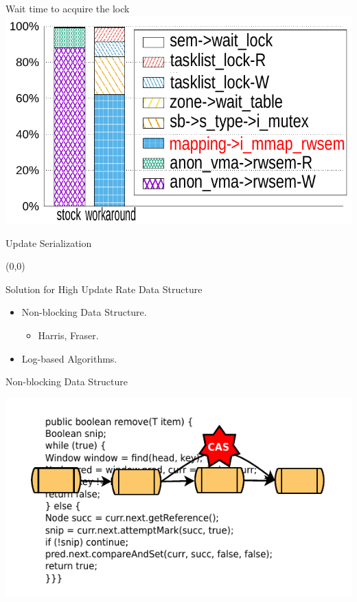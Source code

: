 \documentclass[english]{beamer} %
\begin{document}
\begin{frame}{Wait time to acquire the lock}
\includegraphics[scale=0.8]{fig/lockstat2}
\end{frame}


\begin{frame}{Update Serialization}
\begin{textblock}{1}(0,0)
\end{textblock}
\end{frame}

\begin{frame}{Solution for High Update Rate Data Structure}
    \begin{itemize}[<+-| alert@+>]
    \item Non-blocking Data Structure.
    \begin{itemize}
        \item Harris, Fraser.
    \end{itemize}
    \item Log-based Algorithms. 
    \end{itemize}
\end{frame}


\begin{frame}{Non-blocking Data Structure}
\begin{center}
\includegraphics[scale=1.0]{fig/nonblock}
\end{center}
\end{frame}
\end{document}
